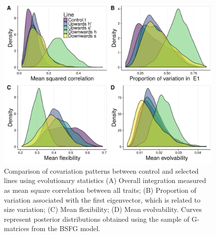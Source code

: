 \begin{refsection}
\begin{figure}
\centering
\includegraphics[width = 12cm]{chapter_ratones/media/SI/figureS9_Fig3Gversion.png}
\caption{Comparison of covariation patterns between control and selected lines using evolutionary statistics (A) Overall integration measured as mean square correlation between all traits; (B) Proportion of variation associated with the first eigenvector, which is related to size variation; (C) Mean flexibility; (D) Mean evolvability. Curves represent posterior distributions obtained using the sample of G-matrices from the BSFG model.}
\end{figure}


\end{refsection}
